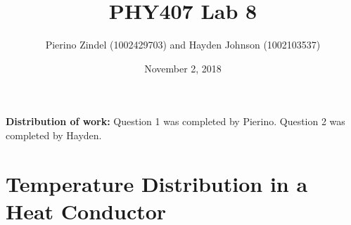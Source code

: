 \documentclass{article}
\title{PHY407 Lab 8}
\author{Pierino Zindel (1002429703) and Hayden Johnson (1002103537)}
\date{November 2, 2018}
\begin{document}
\maketitle

\noindent \textbf{Distribution of work:} Question 1 was completed by Pierino. Question 2 was completed by Hayden.

\section{Temperature Distribution in a Heat Conductor}
\end{document}
